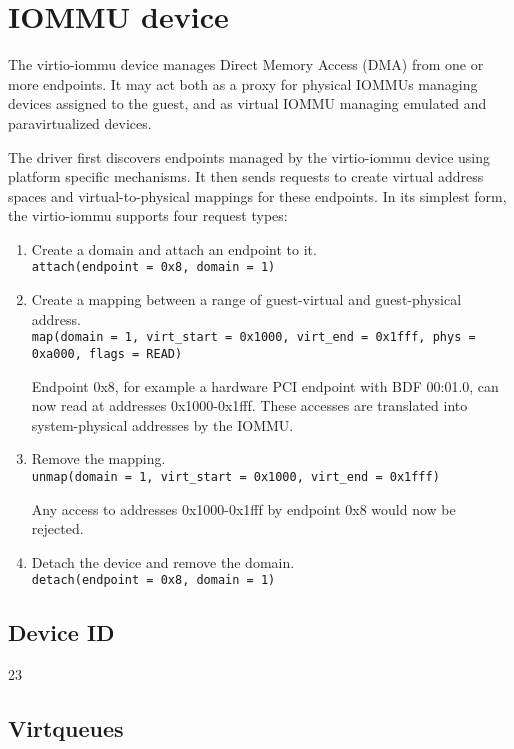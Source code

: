\section{IOMMU device}\label{sec:Device Types / IOMMU Device}

The virtio-iommu device manages Direct Memory Access (DMA) from one or
more endpoints. It may act both as a proxy for physical IOMMUs managing
devices assigned to the guest, and as virtual IOMMU managing emulated and
paravirtualized devices.

The driver first discovers endpoints managed by the virtio-iommu device
using platform specific mechanisms. It then sends requests to create
virtual address spaces and virtual-to-physical mappings for these
endpoints. In its simplest form, the virtio-iommu supports four request
types:

\begin{enumerate}
\item Create a domain and attach an endpoint to it.  \\
  \texttt{attach(endpoint = 0x8, domain = 1)}
\item Create a mapping between a range of guest-virtual and guest-physical
  address. \\
  \texttt{map(domain = 1, virt_start = 0x1000, virt_end = 0x1fff,
          phys = 0xa000, flags = READ)}

  Endpoint 0x8, for example a hardware PCI endpoint with BDF 00:01.0, can
  now read at addresses 0x1000-0x1fff. These accesses are translated
  into system-physical addresses by the IOMMU.

\item Remove the mapping.\\
  \texttt{unmap(domain = 1, virt_start = 0x1000, virt_end = 0x1fff)}

  Any access to addresses 0x1000-0x1fff by endpoint 0x8 would now be
  rejected.
\item Detach the device and remove the domain.\\
  \texttt{detach(endpoint = 0x8, domain = 1)}
\end{enumerate}

\subsection{Device ID}\label{sec:Device Types / IOMMU Device / Device ID}

23

\subsection{Virtqueues}\label{sec:Device Types / IOMMU Device / Virtqueues}

